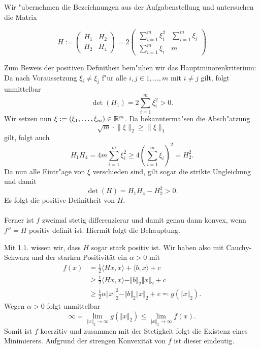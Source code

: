 Wir "ubernehmen die Bezeichnungen aus der Aufgabenstellung und untersuchen die Matrix

\[
H:=
\begin{pmatrix}
H_1 & H_2 \\ H_2 & H_4 \end{pmatrix}
= 2 \begin{pmatrix}
\sum_{i=1}^m \xi_i^2 & \sum_{i=1}^m \xi_i \\
\sum_{i=1}^m \xi_i & m
\end{pmatrix}
\]
\begin{compactenum}[(i)]
\item Zum Beweis der positiven Definitheit
bem"uhen wir das Hauptminorenkriterium: Da
nach Voraussetzung $\xi_i \neq \xi_j$ f"ur alle $i,j \in {1,\ldots,m}$ mit $i\neq j$ gilt, folgt unmittelbar
\[
\det(H_1) = 2\sum_{i=1}^m \xi_i^2 > 0.
\]
Wir setzen nun $\xi := (\xi_1,\ldots,\xi_m)\in\mathbb{R}^m$. Da bekannterma"sen die Absch"atzung
\[
\sqrt m\cdot \lVert \xi \rVert_2 \ge \lVert \xi \rVert_1
\]
gilt, folgt auch
\[
H_1 H_4 = 4 m \sum_{i=1}^m \xi_i^2
\ge 4\left(\sum_{i=1}^m \xi_i\right)^2
= H_2^2.
\]
Da nun alle Eintr"age von $\xi$ verschieden
sind, gilt sogar die strikte Ungleichung und
damit
\[
\det(H) = H_1 H_4 - H_2^2 > 0.
\]
Es folgt die positive Definitheit von $H$. \\ \\
Ferner ist $f$ zweimal stetig differenzierar und damit genau dann konvex, wenn $f''=H$ positiv definit ist. 
Hiermit folgt die Behauptung.

 \item Mit 1.1. wissen wir, dass $H$ sogar stark positiv ist. Wir haben also mit Cauchy-Schwarz und der starken Positivität
 ein $\alpha > 0$ mit
 \begin{align*}
  f(x)&=\frac{1}{2}\langle Hx,x\rangle+\langle b, x\rangle+c\\
  &\geq\frac{1}{2}\langle Hx,x\rangle-\Vert b\Vert_2\Vert x\Vert_2+c\\
  &\geq\frac{1}{2}\alpha\Vert x\Vert_2^2-\Vert b\Vert_2\Vert x\Vert_2+c \eqqcolon g(\Vert x\Vert_2).
 \end{align*}
 Wegen $\alpha >0$ folgt unmittelbar
 \begin{displaymath}
  \infty=\lim_{\Vert x\Vert_2\to\infty}g(\Vert x\Vert_2)\leq \lim_{\Vert x\Vert_2\to\infty} f(x).
 \end{displaymath}
 Somit ist $f$ koerzitiv und zusammen mit der Stetigkeit folgt die Existenz eines Minimierers. Aufgrund der strengen Konvexität von $f$ ist dieser eindeutig.

\end{compactenum}
